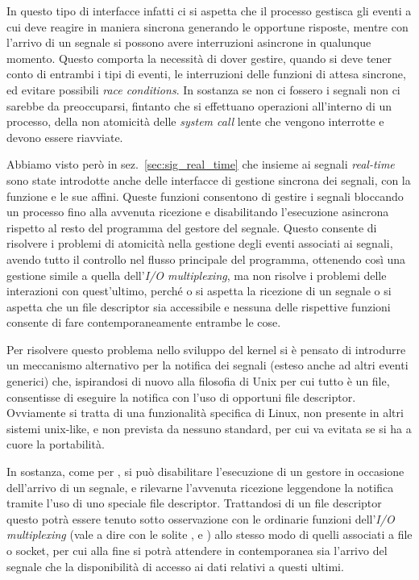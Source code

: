 In questo tipo di interfacce infatti ci si aspetta che il processo gestisca
gli eventi a cui deve reagire in maniera sincrona generando le opportune
risposte, mentre con l'arrivo di un segnale si possono avere interruzioni
asincrone in qualunque momento.  Questo comporta la necessità di dover
gestire, quando si deve tener conto di entrambi i tipi di eventi, le
interruzioni delle funzioni di attesa sincrone, ed evitare possibili
\textit{race conditions}. In sostanza se non ci fossero i segnali non ci
sarebbe da preoccuparsi, fintanto che si effettuano operazioni all'interno di
un processo, della non atomicità delle \textit{system call} lente che vengono
interrotte e devono essere riavviate.

Abbiamo visto però in sez.~\ref{sec:sig_real_time} che insieme ai segnali
\textit{real-time} sono state introdotte anche delle interfacce di gestione
sincrona dei segnali, con la funzione  e le sue affini. Queste
funzioni consentono di gestire i segnali bloccando un processo fino alla
avvenuta ricezione e disabilitando l'esecuzione asincrona rispetto al resto
del programma del gestore del segnale. Questo consente di risolvere i problemi
di atomicità nella gestione degli eventi associati ai segnali, avendo tutto il
controllo nel flusso principale del programma, ottenendo così una gestione
simile a quella dell'\textit{I/O multiplexing}, ma non risolve i problemi
delle interazioni con quest'ultimo, perché o si aspetta la ricezione di un
segnale o si aspetta che un file descriptor sia accessibile e nessuna delle
rispettive funzioni consente di fare contemporaneamente entrambe le cose.

Per risolvere questo problema nello sviluppo del kernel si è pensato di
introdurre un meccanismo alternativo per la notifica dei segnali (esteso anche
ad altri eventi generici) che, ispirandosi di nuovo alla filosofia di Unix per
cui tutto è un file, consentisse di eseguire la notifica con l'uso di
opportuni file descriptor. Ovviamente si tratta di una funzionalità specifica
di Linux, non presente in altri sistemi unix-like, e non prevista da nessuno
standard, per cui va evitata se si ha a cuore la portabilità.

In sostanza, come per , si può disabilitare l'esecuzione di un
gestore in occasione dell'arrivo di un segnale, e rilevarne l'avvenuta
ricezione leggendone la notifica tramite l'uso di uno speciale file
descriptor. Trattandosi di un file descriptor questo potrà essere tenuto sotto
osservazione con le ordinarie funzioni dell'\textit{I/O multiplexing} (vale a
dire con le solite ,  e ) allo
stesso modo di quelli associati a file o socket, per cui alla fine si potrà
attendere in contemporanea sia l'arrivo del segnale che la disponibilità di
accesso ai dati relativi a questi ultimi.

